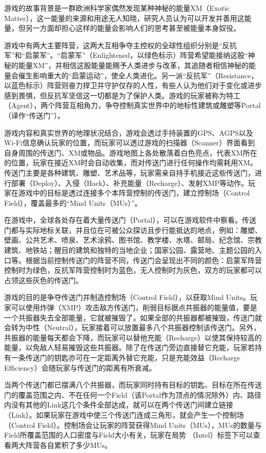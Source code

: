 \documentclass[UTF8]{ctexart}
\begin{document}
\begin{tcolorbox}
    游戏的故事背景是一群欧洲科学家偶然发现某种神秘的能量XM（Exotic Matter），这一能量的来源和用途无人知晓，研究人员认为可以开发并善用这能量，但另一方面却担心这样的能量会影响人们的思考甚至被能量本身奴役。

    游戏中有两大主要阵营，这两大互相争夺主控权的全球性组织分别是“反抗军”和“启蒙军”。“启蒙军”（Enlightened，以绿色标示）阵营希望能接纳这股“神秘的能量XM”，并相信这股能量能赐予人类进步与改革，其追随者相信神秘的能量会催生影响重大的“启蒙运动”，使全人类进化。另一派“反抗军”（Resistance，以蓝色标示）阵营则奋力捍卫并守护仅存的人性，有些人认为他们对于变化或进步感到畏惧，但反抗军坚信这一切都是为了保护人类。游戏的玩家被称为特工（Agent），两个阵营互相角力，争夺控制真实世界中的地标性建筑或雕塑等Portal（译作“传送门”）。

    游戏内容和真实世界的地理状况结合，游戏会透过手持装置的GPS、AGPS以及Wi-Fi信息确认玩家的位置，而玩家可以透过游戏的扫描器（Scanner）界面看到自身周围的传送门、XM或物品。游戏地图上各处散落着白色亮点，代表XM所在的位置，玩家在接近XM时会自动收集，而对传送门进行任何操作均需耗用XM。传送门主要是各种建筑、雕塑、艺术品等，玩家需亲自持手机接近这些传送门，进行部署（Deploy）、入侵（Hack）、补充能量（Recharge）、发射XMP等动作。玩家在游戏中的目标是透过连接多个本阵营控制的传送门，建立控制场（Control Field），覆盖最多的“Mind Units（MUs）”。

    在游戏中，全球各处存在着大量传送门（Portal），可以在游戏软件中察看。传送门都与实际地标关联，并且位在可被公众探访且步行能抵达的地点，例如：雕塑、壁画、公共艺术、喷泉、艺术涂鸦、图书馆、教学楼、水塔、邮局、纪念馆、宗教建筑、地铁站；醒目的建筑和独特的当地企业；国家公园、露营地、主题公园的入口等。根据当前控制传送门的阵营不同，传送门会呈现出不同的颜色：启蒙军阵营控制时为绿色，反抗军阵营控制时为蓝色，无人控制时为灰色，双方的玩家都可以占领这些灰色的传送门。

    游戏的目的是争夺传送门并制造控制场（Control Field），以获取Mind Units。玩家可以使用炸弹（XMP）攻击敌方传送门，削弱目标据点共振器的能量值，要是一个共振器失去全部能量，它就被摧毁了。如果全部的共振器都被摧毁，传送门就会转为中性（Neutral），玩家接着可以放置最多八个共振器控制该传送门。另外，共振器的能量每天都会下降，而玩家可以替他充能（Recharge）以使其保持较高的能量，以免敌人轻易摧毁这些共振器。除了在传送门旁边直接替它充能，玩家若持有一条传送门的钥匙亦可在一定距离外替它充能，只是充能效益（Recharge Efficiency）会随玩家与传送门的距离有所衰减。

    当两个传送门都已摆满八个共振器，而玩家同时持有目标的钥匙、目标在所在传送门的覆盖范围之内、不在任何一个Field（该Portal作为顶点的情况除外）内、路径内没有其他的Link这几个条件全部达成，就可以在两个传送门间建立链接（Link）。如果玩家在游戏中使三个传送门连成三角形，就会产生一个控制场（Control Field）。控制场会让玩家的阵营获得Mind Units（MUs），MUs的数量与Field所覆盖范围的人口密度与Field大小有关，玩家在局势 （Intel）标签下可以查看两大阵营各自累积了多少MUs。


\end{tcolorbox}
\end{document}
